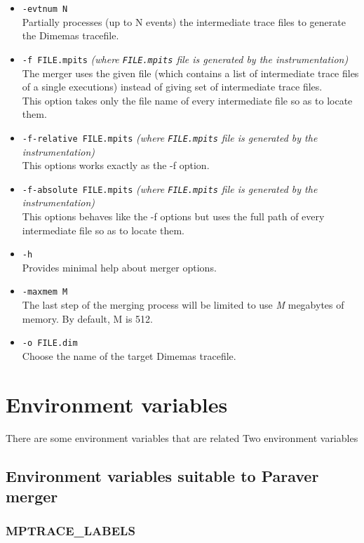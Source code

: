 \begin{itemize}
 \item {\tt -evtnum N}\\
 Partially processes (up to N events) the intermediate trace files to generate the Dimemas tracefile.
 \item {\tt -f FILE.mpits} {\em (where {\tt FILE.mpits} file is generated by the instrumentation)}\\
 The merger uses the given file (which contains a list of intermediate trace files of a single executions) instead of giving set of intermediate trace files.\\
 This option takes only the file name of every intermediate file so as to locate them.
 \item {\tt -f-relative FILE.mpits} {\em (where {\tt FILE.mpits} file is generated by the instrumentation)}\\
 This options works exactly as the -f option.
 \item {\tt -f-absolute FILE.mpits} {\em (where {\tt FILE.mpits} file is generated by the instrumentation)}\\
 This options behaves like the -f options but uses the full path of every intermediate file so as to locate them.
 \item {\tt -h}\\
 Provides minimal help about merger options.
 \item {\tt -maxmem M}\\
 The last step of the merging process will be limited to use {\em M} megabytes of memory. By default, M is 512.
 \item {\tt -o FILE.dim}\\
 Choose the name of the target Dimemas tracefile.
\end{itemize}

\section{Environment variables}

There are some environment variables that are related Two environment variables 

\subsection{Environment variables suitable to Paraver merger}

\subsubsection{MPTRACE\_LABELS}


